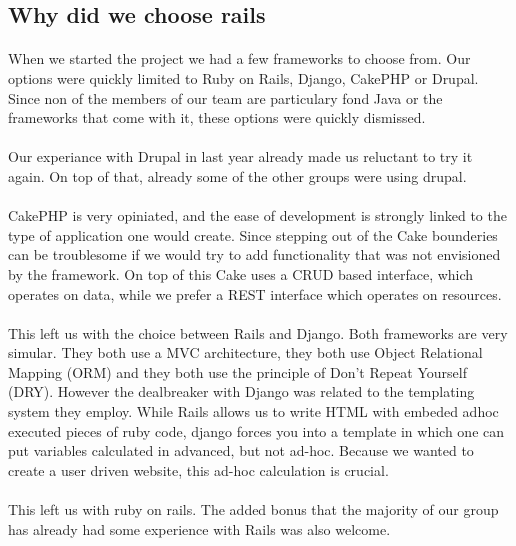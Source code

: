 \subsection{Why did we choose rails} %
\label{sub:Why did we choose rails}
\paragraph{}When we started the project we had a few frameworks to choose from. Our options were quickly limited to Ruby on Rails, Django, CakePHP or Drupal. Since non of the members of our team are particulary fond Java or the frameworks that come with it, these options were quickly dismissed. 
\paragraph{}Our experiance with Drupal in last year already made us reluctant to try it again. On top of that, already some of the other groups were using drupal.
\paragraph{}CakePHP is very opiniated, and the ease of development is strongly linked to the type of application one would create. Since stepping out of the Cake bounderies can be troublesome if we would try to add functionality that was not envisioned by the framework. On top of this Cake uses a CRUD based interface, which operates on data, while we prefer a REST interface which operates on resources.
\paragraph{}This left us with the choice between Rails and Django. Both frameworks are very simular. They both use a MVC architecture, they both use Object Relational Mapping (ORM) and they both use the principle of Don't Repeat Yourself (DRY). However the dealbreaker with Django was related to the templating system they employ. While Rails allows us to write HTML with embeded adhoc executed pieces of ruby code, django forces you into a template in which one can put variables calculated in advanced, but not ad-hoc. Because we wanted to create a user driven website, this ad-hoc calculation is crucial.
\paragraph{}This left us with ruby on rails. The added bonus that the majority of our group has already had some experience with Rails was also welcome.
